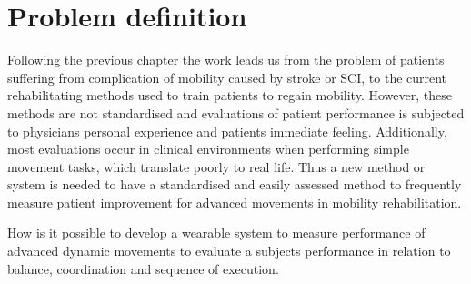 \section{Problem definition}

Following the previous chapter the work leads us from the problem of patients suffering from complication of mobility caused by stroke or SCI, to the current rehabilitating methods used to train patients to regain mobility. However, these methods are not standardised and evaluations of patient performance is subjected to physicians personal experience and patients immediate feeling. Additionally, most evaluations occur in clinical environments when performing simple movement tasks, which translate poorly to real life. Thus a new method or system is needed to have a standardised and easily assessed method to frequently measure patient improvement for advanced movements in mobility rehabilitation.

\begin{center}
How is it possible to develop a wearable system to measure performance of advanced dynamic movements to evaluate a subjects performance in relation to balance, coordination and sequence of execution.
\end{center}
